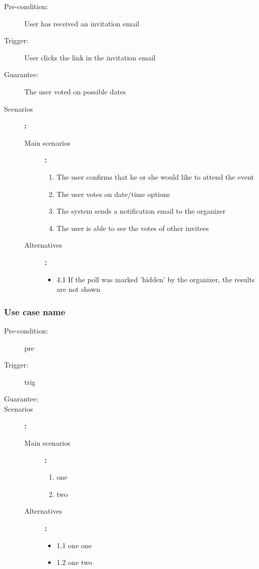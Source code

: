 \begin{description}
	\item[Pre-condition:] User has received an invitation email
	\item[Trigger:] User clicks the link in the invitation email
	\item[Guarantee:] The user voted on possible dates
	\item[Scenarios]\textbf{:}\\
				\begin{description}
					\item[Main scenarios]\textbf{:}\\
								\begin{enumerate}
									\item The user confirms that he or she would like to attend the event
									\item The user votes on date/time options
									\item The system sends a notification email to the organizer
									\item The user is able to see the votes of other invitees
								\end{enumerate}
					\item[Alternatives]\textbf{:}\\
								\begin{itemize}
									\item 4.1 If the poll was marked 'hidden' by the organizer, the results are not shown
								\end{itemize}
				\end{description}
\end{description}



\subsubsection{Use case name}

\begin{description}
	\item[Pre-condition:] pre
	\item[Trigger:] trig
	\item[Guarantee:]
	\item[Scenarios]\textbf{:}\\
				\begin{description}
					\item[Main scenarios]\textbf{:}\\
								\begin{enumerate}
									\item one
									\item two
								\end{enumerate}
					\item[Alternatives]\textbf{:}\\
								\begin{itemize}
									\item 1.1 one one
									\item 1.2 one two
								\end{itemize}
				\end{description}
\end{description}


